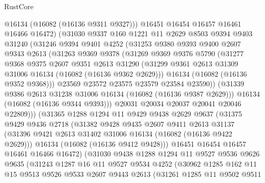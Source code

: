 \begin{lexlean}{RustCore}
\begin{coremodule}
            @16134
            (@16082 (@16136 @9311 @9327)))
          @16451
          @16454
          @16457
          @16461
          @16466
          @16472)
        (@31030
          @9337
          @160
          @1221
          @11
          @2629
          @8503
          @9394
          @9403
          @31240
          (@31246
            @9394
            @9401
            @4252
            (@31253
              @9380
              @9393
              @9400
              @2607
              @9343
              @2613
              (@31263
                @9369
                @9378
                (@31269
                  @9369
                  @9376
                  @5790
                  (@31277
                    @9368
                    @9375
                    @2607
                    @9351
                    @2613
                    @31290
                    (@31299 @9361 @2613 @31309 @31006 @16134 (@16082 (@16136 @9362 @2629)))
                    @16134
                    (@16082 (@16136 @9352 @9368)))
                  @23569
                  @23572
                  @23575
                  @23579
                  @23584
                  @23590))
              (@31339 @9386 @2613 @31238 @31006 @16134 (@16082 (@16136 @9387 @2629)))
              @16134
              (@16082 (@16136 @9344 @9393)))
            @20031
            @20034
            @20037
            @20041
            @20046
            @22809)))
      (@31365
        @1288
        @1294
        @11
        @9429
        @9438
        @2629
        @9637
        (@31375
          @9429
          @9436
          @2718
          (@31382
            @9428
            @9435
            @2607
            @9411
            @2613
            @31137
            (@31396 @9421 @2613 @31402 @31006 @16134 (@16082 (@16136 @9422 @2629)))
            @16134
            (@16082 (@16136 @9412 @9428)))
          @16451
          @16454
          @16457
          @16461
          @16466
          @16472)
        (@31030
          @9438
          @1288
          @1294
          @11
          @9527
          @9536
          @9626
          @9635
          (@31243
            @1287
            @16
            @11
            @9527
            @9534
            @4252
            (@30962
              @1285
              @162
              @11
              @15
              @9513
              @9526
              @9533
              @2607
              @9443
              @2613
              (@31261
                @1285
                @11
                @9502
                @9511

\end{coremodule}
\end{lexlean}
